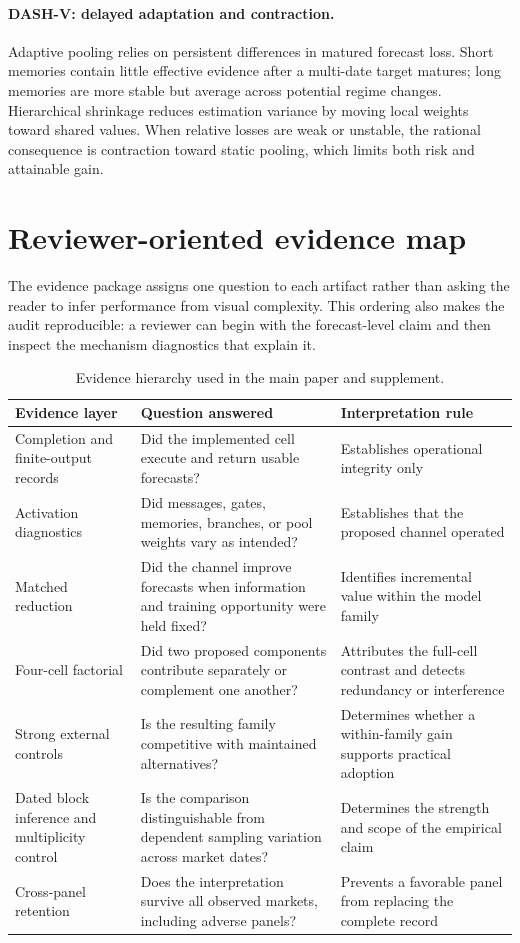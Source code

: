 \documentclass[10pt]{article}
\begin{document}
\paragraph{DASH-V: delayed adaptation and contraction.}
Adaptive pooling relies on persistent differences in matured forecast loss.
Short memories contain little effective evidence after a multi-date target
matures; long memories are more stable but average across potential regime
changes. Hierarchical shrinkage reduces estimation variance by moving local
weights toward shared values. When relative losses are weak or unstable, the
rational consequence is contraction toward static pooling, which limits both
risk and attainable gain.

\section{Reviewer-oriented evidence map}

The evidence package assigns one question to each artifact rather than asking
the reader to infer performance from visual complexity. This ordering also
makes the audit reproducible: a reviewer can begin with the forecast-level
claim and then inspect the mechanism diagnostics that explain it.

\begin{table}[H]
\centering
\small
\caption{Evidence hierarchy used in the main paper and supplement.}
\begin{tabular}{p{3.1cm}p{4.4cm}p{6.1cm}}
\toprule
Evidence layer & Question answered & Interpretation rule \\
\midrule
Completion and finite-output records & Did the implemented cell execute and return usable forecasts? & Establishes operational integrity only \\
Activation diagnostics & Did messages, gates, memories, branches, or pool weights vary as intended? & Establishes that the proposed channel operated \\
Matched reduction & Did the channel improve forecasts when information and training opportunity were held fixed? & Identifies incremental value within the model family \\
Four-cell factorial & Did two proposed components contribute separately or complement one another? & Attributes the full-cell contrast and detects redundancy or interference \\
Strong external controls & Is the resulting family competitive with maintained alternatives? & Determines whether a within-family gain supports practical adoption \\
Dated block inference and multiplicity control & Is the comparison distinguishable from dependent sampling variation across market dates? & Determines the strength and scope of the empirical claim \\
Cross-panel retention & Does the interpretation survive all observed markets, including adverse panels? & Prevents a favorable panel from replacing the complete record \\
\bottomrule
\end{tabular}
\end{table}
\end{document}
